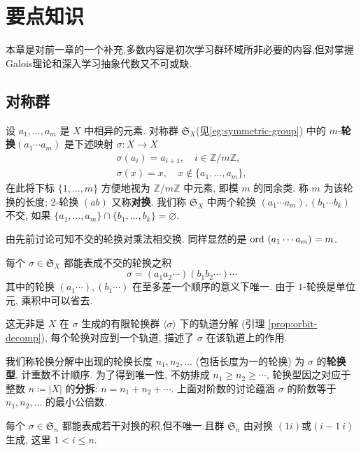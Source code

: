 \chapter{要点知识}
本章是对前一章的一个补充,多数内容是初次学习群环域所非必要的内容,但对掌握Galois理论和深入学习抽象代数又不可或缺.
\section{对称群}
\begin{definition}
	设 $a_1, \ldots, a_m$ 是 $X$ 中相异的元素. 对称群 $\mathfrak{S}_X$(见\ref{eg:symmetric-group}) 中的 $m$-\textbf{轮换}$(a_1 \cdots a_m)$ 是下述映射 $\sigma: X \to X$
	\begin{gather*}
		\sigma(a_i) = a_{i+1}, \quad i \in \mathbb{Z}/m\mathbb{Z}, \\
		\sigma(x)=x, \quad x \notin \{a_1, \ldots, a_m\},
	\end{gather*}
	在此将下标 $\{1, \ldots, m\}$ 方便地视为 $\mathbb{Z}/m\mathbb{Z}$ 中元素, 即模 $m$ 的同余类. 称 $m$ 为该轮换的长度; $2$-轮换 $(a b)$ 又称\textbf{对换}. 我们称 $\mathfrak{S}_X$ 中两个轮换 $(a_1 \cdots a_m),(b_1 \cdots b_k)$ 不交, 如果 $\{a_1, \ldots, a_m\} \cap \{b_1, \ldots, b_k\} = \varnothing$. 
\end{definition}

由先前讨论可知不交的轮换对乘法相交换. 同样显然的是 $\operatorname{\mathrm{ord}}\ (a_1 \cdots a_m) = m$.

\begin{proposition}[轮换分解]\label{prop:cyclic-decomposition}
	每个 $\sigma \in \mathfrak{S}_X$ 都能表成不交的轮换之积
	\[ \sigma = (a_1 a_2 \cdots) (b_1 b_2 \cdots) \cdots \]
	其中的轮换 $(a_1 \cdots),(b_1 \cdots)$ 在至多差一个顺序的意义下唯一. 由于 $1$-轮换是单位元, 乘积中可以省去.
\end{proposition}

这无非是 $X$ 在 $\sigma$ 生成的有限轮换群 $\langle\sigma\rangle$ 下的轨道分解 (引理 \ref{prop:orbit-decomp}), 每个轮换对应到一个轨道, 描述了 $\sigma$ 在该轨道上的作用.

我们称轮换分解中出现的轮换长度 $n_1, n_2, \ldots$ (包括长度为一的轮换) 为 $\sigma$ 的\textbf{轮换型}, 计重数不计顺序. 为了得到唯一性, 不妨排成 $n_1 \geq n_2 \geq \cdots$, 轮换型因之对应于整数 $n \coloneqq |X|$ 的\textbf{分拆}: $n = n_1 + n_2 + \cdots$. 上面对阶数的讨论蕴涵 $\sigma$ 的阶数等于 $n_1, n_2, \ldots$ 的最小公倍数. 
\begin{corollary}[对换分解]\label{prop:S_n-generation}
	每个 $\sigma \in \mathfrak{S}_n$ 都能表成若干对换的积,但不唯一.且群 $\mathfrak{S}_n$ 由对换 $(1i)$或$(i-1\ i)$生成, 这里 $1 < i \leqslant n$.
\end{corollary}

